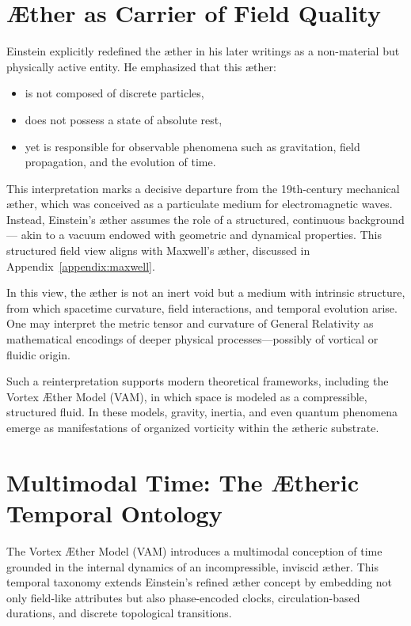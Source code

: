 \documentclass[preprint]{revtex4-2}
\begin{document}
\section{Æther as Carrier of Field Quality}

Einstein explicitly redefined the æther in his later writings as a non-material but physically active entity. He emphasized that this æther:

\begin{itemize}
    \item is not composed of discrete particles,
    \item does not possess a state of absolute rest,
    \item yet is responsible for observable phenomena such as gravitation, field propagation, and the evolution of time.
\end{itemize}

This interpretation marks a decisive departure from the 19th-century mechanical æther, which was conceived as a particulate medium for electromagnetic waves. Instead, Einstein's æther assumes the role of a structured, continuous background — akin to a vacuum endowed with geometric and dynamical properties. This structured field view aligns with Maxwell’s æther, discussed in Appendix~\ref{appendix:maxwell}.

In this view, the æther is not an inert void but a medium with intrinsic structure, from which spacetime curvature, field interactions, and temporal evolution arise. One may interpret the metric tensor and curvature of General Relativity as mathematical encodings of deeper physical processes—possibly of vortical or fluidic origin.

Such a reinterpretation supports modern theoretical frameworks, including the Vortex Æther Model (VAM), in which space is modeled as a compressible, structured fluid. In these models, gravity, inertia, and even quantum phenomena emerge as manifestations of organized vorticity within the ætheric substrate.


\section{Multimodal Time: The Ætheric Temporal Ontology}

The Vortex Æther Model (VAM) introduces a multimodal conception of time grounded in the internal dynamics of an incompressible, inviscid æther. This temporal taxonomy extends Einstein’s refined æther concept by embedding not only field-like attributes but also phase-encoded clocks, circulation-based durations, and discrete topological transitions.
\end{document}
